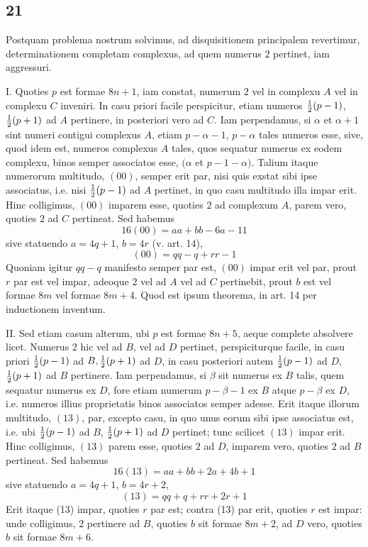 \documentclass[twoside,12pt]{memoir}
\let\oldfrac\frac
\def\frac#1#2{\mathchoice{\tfrac{#1}{#2}}{\oldfrac{#1}{#2}}{\genfrac{}{}{}{2}{#1}{#2\mathstrut}}{\genfrac{}{}{}{3}{#1}{#2\mathstrut}}}
\begin{document}
\subsection*{21}
 
Postquam problema nostrum solvimus, ad disquisitionem principalem revertimur, determinationem completam complexus, ad quem numerus \(2\) pertinet, iam aggressuri.
 
I. Quoties \(p\) est formae \(8 n+1\), iam constat, numerum \(2\) vel in complexu \(A\) vel in complexu \(C\) inveniri. In casu priori facile perspicitur, etiam numeros \(\frac{1}{2}(p-1)\), \(\frac{1}{2}(p+1)\) ad \(A\) pertinere, in posteriori vero ad \(C\). Iam perpendamus, si \(\alpha\) et \(\alpha+1\) sint numeri contigui complexus \(A\), etiam \(p-\alpha-1\), \(p-\alpha\) tales numeros esse, sive, quod idem est, numeros complexus \(A\) tales, quos sequatur numerus ex eodem complexu, binos semper associatos esse, \((\alpha\) et \(p-1-\alpha)\). Talium itaque numerorum multitudo, \((00)\), semper erit par, nisi quis exstat sibi ipse associatus, i.e. nisi \(\frac{1}{2}(p-1)\) ad \(A\) pertinet, in quo casu multitudo illa impar erit. Hinc colligimus, \((00)\) imparem esse, quoties \(2\) ad complexum \(A\), parem vero, quoties \(2\) ad \(C\) pertineat. Sed habemus
\[16(00)=a a+b b-6 a-11\]
sive statuendo \(a=4 q+1\), \(b=4 r\) (v. art. 14),
\[(00)=q q-q+r r-1\]
Quoniam igitur \(q q-q\) manifesto semper par est, \((00)\) impar erit vel par, prout \(r\) par est vel impar, adeoque \(2\) vel ad \(A\) vel ad \(C\) pertinebit, prout \(b\) est vel formae \(8 m\) vel formae \(8 m+4\). Quod est ipsum theorema, in art. 14 per inductionem inventum.
 
II. Sed etiam casum alterum, ubi \(p\) est formae \(8 n+5\), aeque complete absolvere licet. Numerus \(2\) hic vel ad \(B\), vel ad \(D\) pertinet, perspiciturque facile, in casu priori \(\frac{1}{2}(p-1)\) ad \(B, \frac{1}{2}(p+1)\) ad \(D\), in casu posteriori autem \(\frac{1}{2}(p-1)\) ad \(D\), \(\frac{1}{2}(p+1)\) ad \(B\) pertinere. Iam perpendamus, si \(\beta\) sit numerus ex \(B\) talis, quem sequatur numerus ex \(D\), fore etiam numerum \(p-\beta-1\) ex \(B\) atque \(p-\beta\) ex \(D\), i.e. numeros illius proprietatis binos associatos semper adesse. Erit itaque illorum multitudo, \((13)\), par, excepto casu, in quo unus eorum sibi ipse associatus est, i.e. ubi \(\frac{1}{2}(p-1)\) ad \(B\), \(\frac{1}{2}(p+1)\) ad \(D\) pertinet; tunc scilicet \((13)\) impar erit. Hinc colligimus, \((13)\) parem esse, quoties \(2\) ad \(D\), imparem vero, quoties \(2\) ad \(B\) pertineat. Sed habemus
\[16(13)=a a+b b+2 a+4 b+1\]\pagebreak%
sive statuendo \(a=4 q+1\), \(b=4 r+2\),
\[(13)=q q+q+r r+2 r+1\]
Erit itaque (13) impar, quoties \(r\) par est; contra (13) par erit, quoties \(r\) est impar: unde colligimus, \(2\) pertinere ad \(B\), quoties \(b\) sit formae \(8 m+2\), ad \(D\) vero, quoties \(b\) sit formae \(8 m+6\).\\
\end{document}
